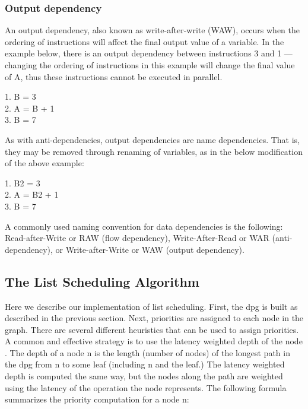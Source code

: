 \subsubsection{Output dependency}

An output dependency, also known as write-after-write (WAW), occurs when the ordering of instructions will affect the final output value of a variable. In the example below, there is an output dependency between instructions 3 and 1 — changing the ordering of instructions in this example will change the final value of A, thus these instructions cannot be executed in parallel.

\begin{center}
	1. B = 3 \\
	2. A = B + 1 \\
	3. B = 7
\end{center}
As with anti-dependencies, output dependencies are name dependencies. That is, they may be removed through renaming of variables, as in the below modification of the above example:

\begin{center}
	1. B2 = 3 \\
	2. A = B2 + 1 \\
	3. B = 7
\end{center}


A commonly used naming convention for data dependencies is the following: Read-after-Write or RAW (flow dependency), Write-After-Read or WAR (anti-dependency), or Write-after-Write or WAW (output dependency).

\subsection{The List Scheduling Algorithm}

Here we describe our implementation of list scheduling. First, the dpg is built as described in the previous
section. Next, priorities are assigned to each node in the graph. There are several different heuristics that
can be used to assign priorities. A common and effective strategy is to use the latency weighted depth of the
node \cite{gibbons1986efficient,landskov1980local}. The depth of a node n is the length (number of nodes) of the longest path in the dpg from n to
some leaf (including n and the leaf.) The latency weighted depth is computed the same way, but the nodes
along the path are weighted using the latency of the operation the node represents. The following formula
summarizes the priority computation for a node n:

